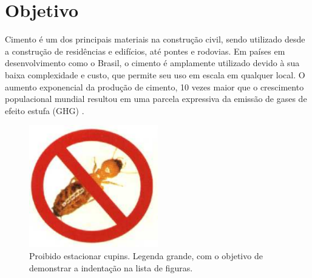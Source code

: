 \section{Objetivo}

Cimento é um dos principais materiais na construção civil, sendo utilizado desde a construção de residências e edifícios, até pontes e rodovias. Em países em desenvolvimento como o Brasil, o cimento é amplamente utilizado devido à sua baixa complexidade e custo, que permite seu uso em escala em qualquer local. O aumento exponencial da produção de cimento, 10 vezes maior que o crescimento populacional mundial \cite{united1995world} resultou em uma parcela expressiva da emissão de gases de efeito estufa (GHG)
\cite{scrivener2018eco}.

\begin{figure}[ht]
\centering
\includegraphics[width=0.5\textwidth]{Cap1/cupim}
\caption{Proibido estacionar cupins. Legenda grande, com o objetivo de demonstrar a indentação na lista de figuras.}
\label{cupim}
\end{figure}